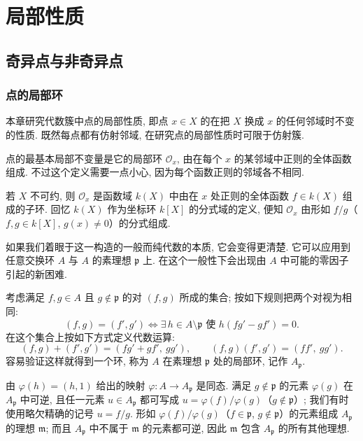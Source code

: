 
\chapter{局部性质}

\section{奇异点与非奇异点}

\subsection{点的局部环}

本章研究代数簇中点的局部性质, 即点 $x \in X$ 的在把 $X$ 换成 $x$ 的任何邻域时不变的性质. 既然每点都有仿射邻域, 在研究点的局部性质时可限于仿射簇.

点的最基本局部不变量是它的局部环 $\mathcal O_x$, 由在每个 $x$ 的某邻域中正则的全体函数组成. 不过这个定义需要一点小心, 因为每个函数正则的邻域各不相同.

若 $X$ 不可约, 则 $\mathcal O_x$ 是函数域 $k(X)$ 中由在 $x$ 处正则的全体函数 $f \in k(X)$ 组成的子环. 回忆 $k(X)$ 作为坐标环 $k[X]$ 的分式域的定义, 便知 $\mathcal O_x$ 由形如 $f/g$（$f, g \in k[X]$, $g(x) \ne 0$）的分式组成.

如果我们着眼于这一构造的一般而纯代数的本质, 它会变得更清楚. 它可以应用到任意交换环 $A$ 与 $A$ 的素理想 $\mathfrak p$ 上. 在这个一般性下会出现由 $A$ 中可能的零因子引起的新困难.

考虑满足 $f, g \in A$ 且 $g \notin \mathfrak p$ 的对 $(f, g)$ 所成的集合; 按如下规则把两个对视为相同:
\begin{equation}
	\label{eq:2.1}
	(f, g) = (f', g') \iff \exists\, h \in A \setminus \mathfrak p \text{ 使 } h(fg' - gf') = 0.
\end{equation}
在这个集合上按如下方式定义代数运算:
\begin{equation}
	\label{eq:2.2}
	(f, g) + (f', g') = (fg' + gf',\ gg'), \qquad
	(f, g)(f', g') = (ff',\ gg').
\end{equation}
容易验证这样就得到一个环, 称为 $A$ 在素理想 $\mathfrak p$ 处的局部环, 记作 $A_{\mathfrak p}$.

由 $\varphi(h) = (h, 1)$ 给出的映射 $\varphi: A \to A_{\mathfrak p}$ 是同态. 满足 $g \notin \mathfrak p$ 的元素 $\varphi(g)$ 在 $A_{\mathfrak p}$ 中可逆, 且任一元素 $u \in A_{\mathfrak p}$ 都可写成 $u = \varphi(f)/\varphi(g)$（$g \notin \mathfrak p$）; 我们有时使用略欠精确的记号 $u = f/g$. 形如 $\varphi(f)/\varphi(g)$（$f \in \mathfrak p$, $g \notin \mathfrak p$）的元素组成 $A_{\mathfrak p}$ 的理想 $\mathfrak m$; 而且 $A_{\mathfrak p}$ 中不属于 $\mathfrak m$ 的元素都可逆, 因此 $\mathfrak m$ 包含 $A_{\mathfrak p}$ 的所有其他理想.

